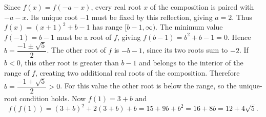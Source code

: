 Since $f(x)=f(-a-x)$, every real root $x$ of the composition is paired with $-a-x$. Its unique root $-1$ must be fixed by this reflection, giving $a=2$. Thus $f(x)=(x+1)^2+b-1$ has range $[b-1,\infty)$.
The minimum value $f(-1)=b-1$ must be a root of $f$, giving $f(b-1)=b^2+b-1=0$. Hence $b=\dfrac{-1\pm\sqrt5}{2}$. The other root of $f$ is $-b-1$, since its two roots sum to $-2$. If $b<0$, this other root is greater than $b-1$ and belongs to the interior of the range of $f$, creating two additional real roots of the composition. Therefore $b=\dfrac{-1+\sqrt5}{2}>0$. For this value the other root is below the range, so the unique-root condition holds.
Now $f(1)=3+b$ and
\[f(f(1))=(3+b)^2+2(3+b)+b=15+9b+b^2=16+8b=\boxed{12+4\sqrt5}.\]
